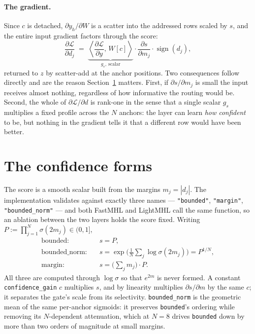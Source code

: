 \documentclass[11pt]{article}
\newcommand{\NAP}{N}
\newcommand{\sgn}{\operatorname{sign}}
\begin{document}
\paragraph{The gradient.}
Since $c$ is detached, $\partial y_h/\partial W$ is a scatter into the addressed rows
scaled by $s$, and the entire input gradient factors through the score:
\begin{equation}
  \frac{\partial \mathcal{L}}{\partial d_j}
   \;=\;
   \underbrace{\left\langle \frac{\partial \mathcal{L}}{\partial y},\,W[c]\right\rangle}_{
      g_s,\ \text{scalar}}
   \cdot \frac{\partial s}{\partial m_j}\cdot \sgn(d_j),
   \label{eq:lightgrad}
\end{equation}
returned to $z$ by scatter-add at the anchor positions. Two consequences follow directly
and are the reason Section~\ref{sec:forms} matters. First, if $\partial s/\partial m_j$
is small the input receives almost nothing, regardless of how informative the routing
would be. Second, the whole of $\partial\mathcal{L}/\partial d$ is rank-one in the sense
that a single scalar $g_s$ multiplies a fixed profile across the $\NAP$ anchors: the
layer can learn \emph{how confident} to be, but nothing in the gradient tells it that a
different row would have been better.

\section{The confidence forms}
\label{sec:forms}

The score is a smooth scalar built from the margins $m_j=|d_j|$. The implementation
validates against exactly three names --- \texttt{"bounded"}, \texttt{"margin"},
\texttt{"bounded\_norm"} --- and both FastMHL and LightMHL call the same function, so an
ablation between the two layers holds the score fixed. Writing
$P:=\prod_{j=1}^{\NAP}\sigma(2m_j)\in(0,1]$,
\begin{align}
  \text{bounded:} \quad & s = P, \\
  \text{bounded\_norm:} \quad
    & s = \exp\!\Big(\tfrac{1}{\NAP}\textstyle\sum_j \log\sigma(2m_j)\Big) = P^{1/\NAP},
      \label{eq:bnorm}\\
  \text{margin:} \quad
    & s = \Big(\textstyle\sum_j m_j\Big)\cdot P .
      \label{eq:margin}
\end{align}
All three are computed through $\log\sigma$ so that $e^{2m}$ is never formed. A constant
\texttt{confidence\_gain} $c$ multiplies $s$, and by linearity multiplies
$\partial s/\partial m$ by the same $c$; it separates the gate's scale from its
selectivity. \texttt{bounded\_norm} is the geometric mean of the same per-anchor
sigmoids: it preserves \texttt{bounded}'s ordering while removing its $\NAP$-dependent
attenuation, which at $\NAP=8$ drives \texttt{bounded} down by more than two orders of
magnitude at small margins.
\end{document}
